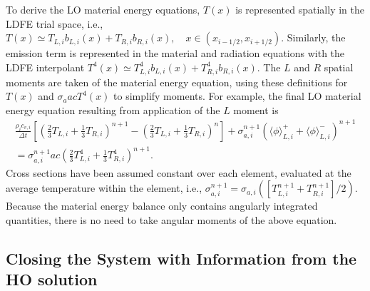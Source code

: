 \documentclass[12pt]{article}
\newcommand{\mom}[1]{\langle #1 \rangle}
\newcommand{\ir}{{i+1/2}}
\begin{document}
\begin{center}
To derive the LO material energy equations, $T(x)$ is represented spatially in
the LDFE trial space, i.e.,
$ T(x) \simeq T_{L,i} b_{L,i}(x) + T_{R,i} b_{R,i}(x),\quad x\in(x_{i-1/2},x_\ir)$.
Similarly, the emission term is represented in the material and radiation equations with the LDFE
interpolant $T^4(x)\simeq T_{L,i}^4 b_{L,i}(x) + T_{R,i}^4 b_{R,i}(x)$.   The $L$ and $R$ spatial moments are taken of the material
energy equation, using these definitions for $T(x)$ and $\sigma_a a c T^4(x)$ to simplify moments. For example, the final LO material energy
 equation resulting from application of the $L$ moment is
 \begin{multline}\label{lo_mat_dis}
     \frac{\rho_i c_{v,i}}{\Delta t}\left[ \left(\frac{2}{3}T_{L,i} + \frac{1}{3}T_{R,i}
        \right)^{n+1} - \left(\frac{2}{3}T_{L,i} + \frac{1}{3}T_{R,i}
    \right)^{n} \right]  + \sigma_{a,i}^{n+1} \left( \mom{\phi}_{L,i}^+ +
    \mom{\phi}_{L,i}^- \right)^{n+1} \\ = \sigma_{a,i}^{n+1}a c
\left( \frac{2}{3} T_{L,i}^4 + \frac{1}{3}T_{R,i}^4
        \right)^{n+1}.
\end{multline}
Cross sections have been assumed constant over each element, evaluated at the
average temperature within the element, i.e., $\sigma_{a,i}^{n+1} =
\sigma_{a,i}([T^{n+1}_{L,i}+T^{n+1}_{R,i}]/2)$.
Because the material energy balance
 only contains angularly integrated quantities, there is no need to take angular
 moments of the above equation.  

\subsection{Closing the System with Information from the HO solution}
\label{sec:closure}


\end{center}
\end{document}
